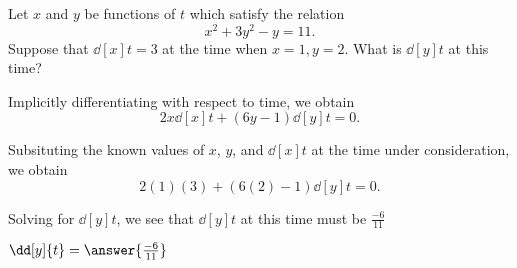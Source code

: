 \documentclass{ximera}
\author{Steven Gubkin}
\begin{document}
\begin{exercise}



Let $x$ and $y$ be functions of $t$ which satisfy the relation
\[
x^2+3y^2-y = 11.
\]
Suppose that $\dd[x]{t} = 3$ at the time when $x = 1, y=2$.
What is $\dd[y]{t}$ at this time?

\begin{hint}
  Implicitly differentiating with respect to time, we obtain
\[
2x\dd[x]{t} +(6y-1) \dd[y]{t} = 0.
\]
\end{hint}

\begin{hint}
  Subsituting the known values of $x$, $y$, and $\dd[x]{t}$ at the
  time under consideration, we obtain
\[
2(1)(3)+(6(2)-1) \dd[y]{t} = 0.
\] 
\end{hint}

\begin{hint}
  Solving for $\dd[y]{t}$, we see that $\dd[y]{t}$ at this time must
  be $\frac{-6}{11}$
\end{hint}

\begin{prompt}
	$\dd[y]{t} = \answer{\frac{-6}{11}}$
\end{prompt}

\end{exercise}
\end{document}
